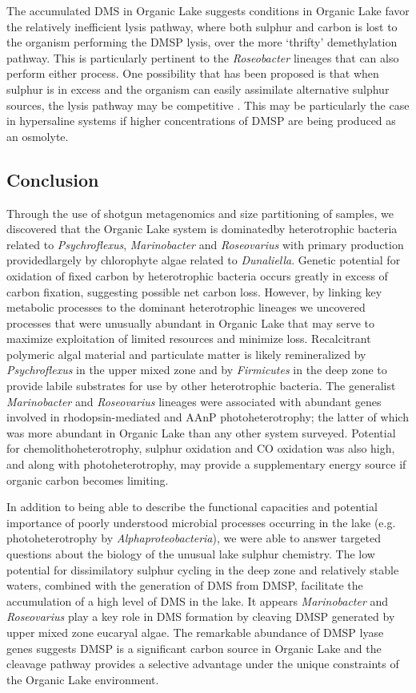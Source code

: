 The accumulated \ac{DMS} in Organic Lake suggests conditions in Organic Lake favor the relatively inefficient lysis pathway, where both sulphur and carbon is lost to the organism performing the \ac{DMSP} lysis, over the more `thrifty' demethylation pathway. 
This is particularly pertinent to the \emph{Roseobacter} lineages that can also perform either process. 
One possibility that has been proposed is that when sulphur is in excess and the organism can easily assimilate alternative sulphur sources, the lysis pathway may be competitive \cite{Johnston2008}. 
This may be particularly the case in hypersaline systems if higher concentrations of \ac{DMSP} are being produced as an osmolyte.

\subsection{Conclusion}
Through the use of shotgun metagenomics and size partitioning of samples, we discovered that the Organic Lake system is dominatedby heterotrophic bacteria related to \emph{Psychroflexus}, \emph{Marinobacter} and \emph{Roseovarius} with primary production providedlargely by chlorophyte algae related to \emph{Dunaliella}. 
Genetic potential for oxidation of fixed carbon by heterotrophic bacteria occurs greatly in excess of carbon fixation, suggesting possible net carbon loss. 
However, by linking key metabolic processes to the dominant heterotrophic lineages we uncovered processes that were unusually abundant in Organic Lake that may serve to maximize exploitation of limited resources and minimize loss. 
Recalcitrant polymeric algal material and particulate matter is likely remineralized by \emph{Psychroflexus} in the upper mixed zone and by \emph{Firmicutes} in the deep zone to provide labile substrates for use by other heterotrophic bacteria. 
The generalist \emph{Marinobacter} and \emph{Roseovarius} lineages were associated with abundant genes involved in rhodopsin-mediated and \ac{AAnP} photoheterotrophy; the latter of which was more abundant in Organic Lake than any other system surveyed. 
Potential for chemolithoheterotrophy, sulphur oxidation and CO oxidation was also high, and along with photoheterotrophy, may provide a supplementary energy source if organic carbon becomes limiting.

In addition to being able to describe the functional capacities and potential importance of poorly understood microbial processes occurring in the lake (e.g. photoheterotrophy by \emph{Alphaproteobacteria}), we were able to answer targeted questions about the biology of the unusual lake sulphur chemistry. 
The low potential for dissimilatory sulphur cycling in the deep zone and relatively stable waters, combined with the generation of \ac{DMS} from \ac{DMSP}, facilitate the accumulation of a high level of \ac{DMS} in the lake. 
It appears \emph{Marinobacter} and \emph{Roseovarius} play a key role in \ac{DMS} formation by cleaving \ac{DMSP} generated by upper mixed zone eucaryal algae. 
The remarkable abundance of \ac{DMSP} lyase genes suggests \ac{DMSP} is a significant carbon source in Organic Lake and the cleavage pathway provides a selective advantage under the unique constraints of the Organic Lake environment.

